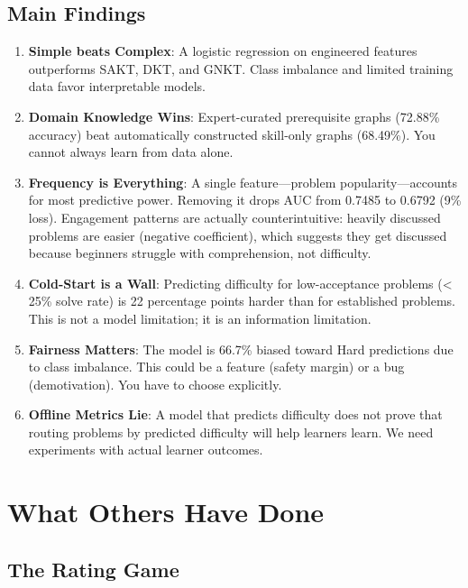 \documentclass[conference]{IEEEtran}
\begin{document}
\subsection{Main Findings}

\begin{enumerate}
    \item \textbf{Simple beats Complex}: A logistic regression on engineered features outperforms SAKT, DKT, and GNKT. Class imbalance and limited training data favor interpretable models.
    
    \item \textbf{Domain Knowledge Wins}: Expert-curated prerequisite graphs (72.88\% accuracy) beat automatically constructed skill-only graphs (68.49\%). You cannot always learn from data alone.
    
    \item \textbf{Frequency is Everything}: A single feature—problem popularity—accounts for most predictive power. Removing it drops AUC from 0.7485 to 0.6792 (9\% loss). Engagement patterns are actually counterintuitive: heavily discussed problems are easier (negative coefficient), which suggests they get discussed because beginners struggle with comprehension, not difficulty.
    
    \item \textbf{Cold-Start is a Wall}: Predicting difficulty for low-acceptance problems (< 25\% solve rate) is 22 percentage points harder than for established problems. This is not a model limitation; it is an information limitation.
    
    \item \textbf{Fairness Matters}: The model is 66.7\% biased toward Hard predictions due to class imbalance. This could be a feature (safety margin) or a bug (demotivation). You have to choose explicitly.
    
    \item \textbf{Offline Metrics Lie}: A model that predicts difficulty does not prove that routing problems by predicted difficulty will help learners learn. We need experiments with actual learner outcomes.
\end{enumerate}

\section{What Others Have Done}

\subsection{The Rating Game}
\end{document}
